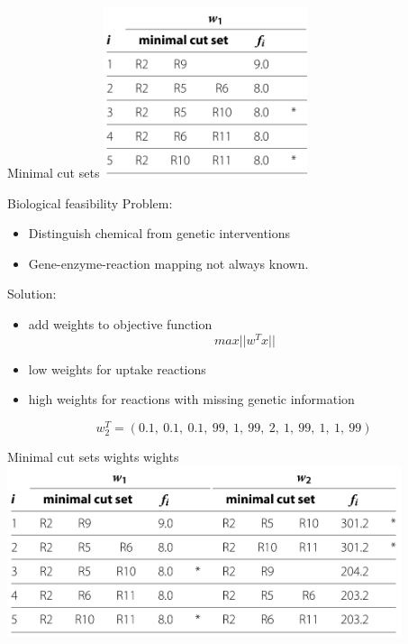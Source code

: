 \documentclass{beamer}
\begin{document}
\begin{frame}{Minimal cut sets}
    \includegraphics[height=5cm]{grafik/table2a} \\
\end{frame}

\begin{frame}{Biological feasibility}
    Problem:
    \begin{itemize}
        \item Distinguish chemical from genetic interventions
        \item Gene-enzyme-reaction mapping not always known.
    \end{itemize}
    Solution: 
    \begin{itemize}
        \item add weights to objective function
        $$max ||w^T x|| $$
        \item low weights for uptake reactions
        \item high weights for reactions with missing genetic information
    \end{itemize}
    \begin{example}
        $$w_2^T = (0.1, ~ 0.1, ~ 0.1, ~ 99, ~ 1, ~ 99, ~ 2, ~ 1, ~ 99, ~ 1, ~ 1, ~ 99)$$
    \end{example}
\end{frame}

\begin{frame}{Minimal cut sets wights wights}
    \includegraphics[height=5cm]{grafik/table2} \\
\end{frame}
\end{document}
